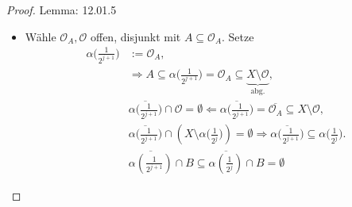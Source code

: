 \begin{proof}{Lemma: 12.01.5}
\begin{itemize}
\begin{itemize}
\begin{itemize}
        $$
        \forall r = \frac{k}{2^i}:\quad \overline{\alpha(r)} 
        \subseteq\overline{\alpha( \frac{2^i - 1}{2^i})}\subseteq\overline{\mathcal{O}}.
        $$ und $(\star)$ gilt auch für $\frac{2\ell +1}{2^j}$
        $A \subseteq \alpha(\frac{2^{j-1}}{2^j})\subseteq \mathcal{O}$
        \begin{equation*}
            \begin{split}
                \mathcal{O} \cup \mathcal{O}_B &= \emptyset \Rightarrow \mathcal{O}
                \subseteq \underset{\text{Abg.}}{X \setminus \mathcal{O}_B}\\
                &\Rightarrow \overline{\mathcal{O}} \subseteq X \setminus \mathcal{O}_B 
                \subseteq X \setminus B \\
                &\Rightarrow \overline{\mathcal{O}}\cup X\setminus B = 
                \emptyset \quad (\star \star)\text{ gilt auch für} \frac{2 \ell +1}{2^j}
            \end{split}
        \end{equation*}
        \item[Fall: $l = 0$] Wähle $\mathcal{O}_A,\mathcal{O}$ offen, disjunkt mit $A \subseteq \mathcal{O}_A$.
        Setze 
        \begin{equation*}
            \begin{split}
                \alpha\bigl(\tfrac{1}{2^{j+1}}\bigr) &:= \mathcal{O}_A,\\
                &\Rightarrow A \subseteq \alpha\bigl(\tfrac{1}{2^{j+1}}\bigr)=\mathcal{O}_A \subseteq 
        \underbrace{X\setminus \mathcal{O}}_{\text{abg.}},\\
        & \overline{\alpha\bigl(\tfrac{1}{2^{j+1}}\bigr)} \cap \mathcal{O} = \emptyset 
          \Leftarrow \overline{\alpha\bigl(\tfrac{1}{2^{j+1}}\bigr)}= \overline{\mathcal{O}_A} \subseteq X \setminus \mathcal{O},\\
        & \overline{\alpha\bigl(\tfrac{1}{2^{j+1}}\bigr)} \cap (X \setminus \alpha\bigl(\tfrac{1}{2^j}\bigr)) = \emptyset 
          \Rightarrow \overline{\alpha\bigl(\tfrac{1}{2^{j+1}}\bigr)}\subseteq\alpha\bigl(\tfrac{1}{2^j}\bigr).\\
        &  \overline{\alpha(\frac{1}{2^{j+1}})} \cap B \subseteq \overline{\alpha(\frac{1}{2^j})}\cap B =\emptyset
        \end{split}
        \end{equation*}
        

\end{itemize}
\end{itemize}
\end{itemize}
\end{proof}
